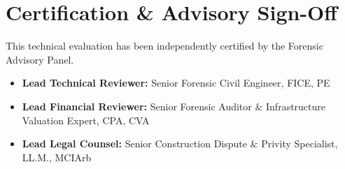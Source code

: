 \documentclass[10pt,a4paper]{article}
\begin{document}
\section{Certification \& Advisory Sign-Off}
This technical evaluation has been independently certified by the Forensic Advisory Panel.
\begin{itemize}
    \item \textbf{Lead Technical Reviewer:} Senior Forensic Civil Engineer, FICE, PE
    \item \textbf{Lead Financial Reviewer:} Senior Forensic Auditor \& Infrastructure Valuation Expert, CPA, CVA
    \item \textbf{Lead Legal Counsel:} Senior Construction Dispute \& Privity Specialist, LL.M., MCIArb
\end{itemize}
\end{document}
